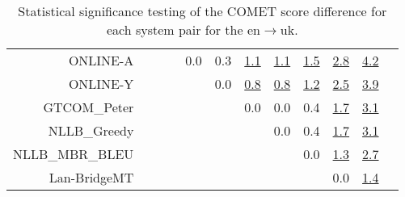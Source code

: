 \documentclass[11pt]{article}
\begin{document}
\begin{sidewaystable}
\begin{center}
{\begin{tabular}{rccccccccccc}
ONLINE-A &  &    &  & \cellcolor{red!0} 0.0 & \cellcolor{red!50} 0.3 & \cellcolor{red!70} \underline{1.1} & \cellcolor{red!70} \underline{1.1} & \cellcolor{red!70} \underline{1.5} & \cellcolor{red!70} \underline{2.8} & \cellcolor{red!70} \underline{4.2}\\ 
ONLINE-Y &    &  &  &  & \cellcolor{red!0} 0.0 & \cellcolor{red!70} \underline{0.8} & \cellcolor{red!70} \underline{0.8} & \cellcolor{red!70} \underline{1.2} & \cellcolor{red!70} \underline{2.5} & \cellcolor{red!70} \underline{3.9}\\ 
GTCOM\_Peter &    &  &  &  &  & \cellcolor{red!0} 0.0 & \cellcolor{red!0} 0.0 & \cellcolor{red!0} 0.4 & \cellcolor{red!70} \underline{1.7} & \cellcolor{red!70} \underline{3.1}\\ 
NLLB\_Greedy &    &  &  &  &  &  & \cellcolor{red!0} 0.0 & \cellcolor{red!60} 0.4 & \cellcolor{red!70} \underline{1.7} & \cellcolor{red!70} \underline{3.1}\\ 
NLLB\_MBR\_BLEU &    &  &  &  &  &  &  & \cellcolor{red!0} 0.0 & \cellcolor{red!70} \underline{1.3} & \cellcolor{red!70} \underline{2.7}\\ 
Lan-BridgeMT &  &    &  &  &  &  &  &  & \cellcolor{red!0} 0.0 & \cellcolor{red!70} \underline{1.4}\\ 
\bottomrule 
\end{tabular} }
\caption{Statistical significance testing of the COMET score difference for each system pair for the en$\rightarrow$uk.} 
 \end{center} \end{sidewaystable} 
\end{document}
